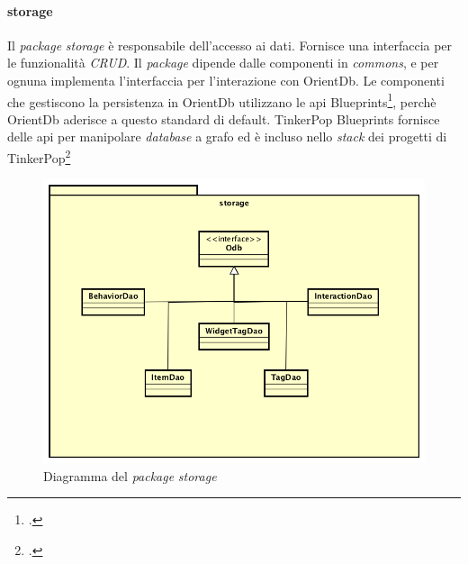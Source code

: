 \paragraph*{storage}
Il \emph{package} \emph{storage} è responsabile dell'accesso ai dati. Fornisce una interfaccia per le funzionalità \emph{CRUD}. Il \emph{package} dipende dalle componenti in \emph{commons}, e per ognuna implementa l'interfaccia per l'interazione con OrientDb. Le componenti che gestiscono la persistenza in OrientDb utilizzano le \gls{api} Blueprints\footcite{https://github.com/tinkerpop/blueprints}, perchè OrientDb aderisce a questo standard di default. TinkerPop Blueprints fornisce delle \gls{api} per manipolare \emph{database} a grafo ed è incluso nello \emph{stack} dei progetti di TinkerPop\footcite{http://tinkerpop.incubator.apache.org/}
\begin{figure}[h]
\centering
\includegraphics[scale=0.28]{immagini/storage}
\caption{Diagramma del \emph{package} \emph{storage}}
\label{fig:pack-storage}
\end{figure}
\newpage
